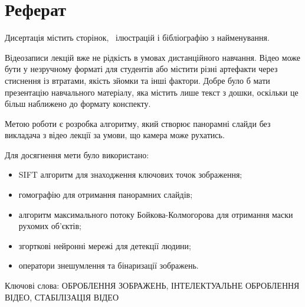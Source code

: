 \chapter*{Реферат}

Дисертація містить
\pageref{LastPage}
сторінок, \totalfigures\ ілюстрацій
і бібліографію з  найменування.

Відеозаписи лекцій вже не рідкість в умовах дистанційного навчання.
Відео може бути у незручному форматі для студентів або містити різні артефакти
через стиснення із втратами, якість зйомки та  інші фактори. Добре було б мати
презентацію навчального матеріалу, яка містить лише текст з дошки,
оскільки це більш наближено до формату конспекту.

Метою роботи є розробка алгоритму,
який створює панорамні слайди без викладача з відео лекції
за умови, що камера може рухатись.

Для досягнення мети було використано:
\begin{itemize}
      \item SIFT алгоритм для знаходження ключових точок зображення;
      \item гомографію для отримання панорамних слайдів;
      \item алгоритм максимального потоку Бойкова-Колмогорова
            для отримання маски рухомих об'єктів;
      \item згорткові нейронні мережі для детекції людини;
      \item оператори знешумлення та бінаризації зображень.
\end{itemize}

Ключові слова:
\MakeUppercase{оброблення зображень, інтелектуальне оброблення відео,
      стабілізація відео}
